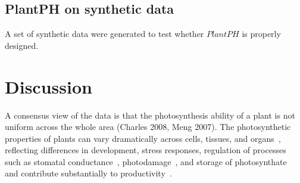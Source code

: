 \documentclass{bioinfo}
\begin{document}
\subsection{PlantPH on synthetic data}

A set of synthetic data were generated to test whether $PlantPH$ is properly designed.








%
%




\section{Discussion}

A consensus view of the data is that the photosynthesis ability of a plant is not uniform across the whole area (Charles 2008, Meng 2007).
%
The photosynthetic properties of plants can vary dramatically across cells, tissues, and organs~\citep{}, reflecting differences in development, stress responses, regulation of processes such as stomatal conductance~\citep{}, photodamage~\citep{}, and storage of photosynthate~\citep{} and contribute substantially to productivity~\citep{}.
\end{document}
